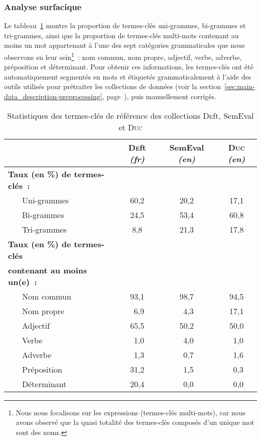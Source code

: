       \subsubsection{Analyse surfacique}
      \label{subsubsec:main:domain_independent_keyphrase_extraction-keyphrase_candidate_selection-analysis_of_keyphrase_properties-shalow_analysis}
      Le tableau~\ref{tab:candidate_selection-train_stats} montre la
      proportion de termes-clés uni-grammes, bi-grammes et tri-gram\-mes, ainsi
      que la proportion de termes-clés multi-mots contenant au moins un mot
      appartenant à l'une des sept catégories grammaticales que nous observons
      en leur sein\footnote{ Nous nous focalisons sur les expressions
      (termes-clés multi-mots), car nous avons observé que la quasi totalité des
      termes-clés composés d'un unique mot sont des noms. }~: nom commun, nom
      propre, adjectif, verbe, adverbe, préposition et déterminant. Pour obtenir
      ces informations, les termes-clés ont été automatiquement segmentés en
      mots et étiquetés grammaticalement à l'aide des outils utilisés pour
      prétraiter les collections de données (voir la
      section~\ref{sec:main-data_description-preprocessing},
      page~\pageref{sec:main-data_description-preprocessing}), puis manuellement
      corrigés.
      \begin{table}[!h]
        \centering
        \begin{tabular}{ll|ccc}
          \toprule
          & & \textbf{\textsc{De}ft} \textit{(fr)} & \textbf{SemEval} \textit{(en)} & \textbf{\textsc{Duc}} \textit{(en)}\\
          \hline
          \multicolumn{2}{l|}{\textbf{Taux (en \%) de termes-clés~:}}\\
          & Uni-grammes & 60,2 & 20,2 & 17,1\\
          & Bi-grammes & 24,5 & 53,4 & 60,8\\
          & Tri-grammes & 8,8 & 21,3 & 17,8\\
          \hline
          \multicolumn{2}{l|}{\textbf{Taux (en \%) de termes-clés}} & & &\\
          \multicolumn{2}{l|}{\textbf{contenant au moins un(e)~:}} & & &\\
          & Nom commun & 93,1 & 98,7 & 94,5\\
          & Nom propre & $~~$6,9 & $~~$4,3 & 17,1\\
          & Adjectif & 65,5 & 50,2 & 50,0\\
          & Verbe & $~~$1,0 & $~~$4,0 & $~~$1,0\\
          & Adverbe & $~~$1,3 & $~~$0,7 & $~~$1,6\\
          & Préposition & 31,2 & $~~$1,5 & $~~$0,3\\
          & Déterminant & 20,4 & $~~$0,0 & $~~$0,0\\
          \bottomrule
        \end{tabular}
        \caption{Statistiques des termes-clés de référence des
                 collections \textsc{De}ft, SemEval et \textsc{Duc}
                 \label{tab:candidate_selection-train_stats}}
      \end{table}

